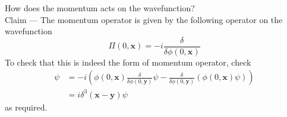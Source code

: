 \documentclass[11pt]{article}
\numberwithin{equation}{section}
\begin{document}
    How does the momentum acts on the wavefunction?\\
    Claim — The momentum operator is given by the following operator on the wavefunction 
    \begin{equation}
        \Pi(0, \textbf{x}) = -i\frac{\delta}{\delta\phi(0, \textbf{x})}
    \end{equation}
    To check that this is indeed the form of momentum operator, check
    \begin{align*}
        [\phi(0, \textbf{x}), \Pi(0, \textbf{y})]\psi &= -i\left( \phi(0, \textbf{x}) \frac{\delta}{\delta \phi(0, \textbf{y})} \psi - \frac{\delta}{\delta \phi(0, \textbf{y})}(\phi(0, \textbf{x}) \psi)  \right)\\
        &=i \delta^3(\textbf{x} - \textbf{y})\psi       
    \end{align*}
    as required.\\
\end{document}
